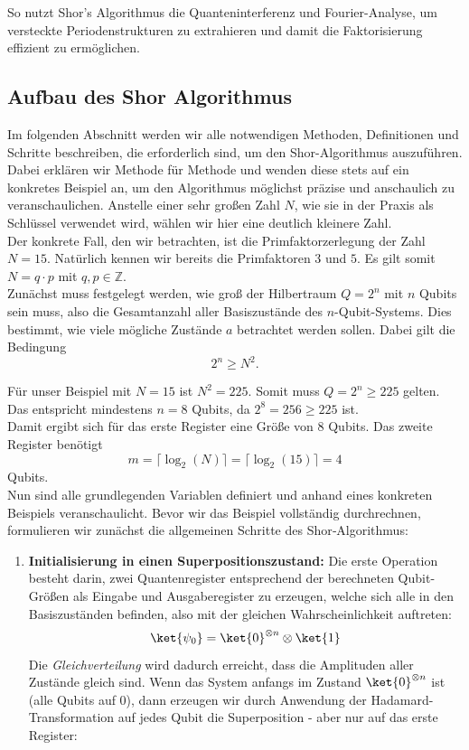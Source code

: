 {So nutzt Shor's Algorithmus die Quanteninterferenz und Fourier-Analyse, um versteckte Periodenstrukturen zu extrahieren und damit die Faktorisierung effizient zu ermöglichen.

\subsection{Aufbau des Shor Algorithmus}

Im folgenden Abschnitt werden wir alle notwendigen Methoden, Definitionen und Schritte beschreiben, die erforderlich sind, um den Shor-Algorithmus auszuführen. Dabei erklären wir Methode für Methode und wenden diese stets auf ein konkretes Beispiel an, um den Algorithmus möglichst präzise und anschaulich zu veranschaulichen. Anstelle einer sehr großen Zahl \( N \), wie sie in der Praxis als Schlüssel verwendet wird, wählen wir hier eine deutlich kleinere Zahl. \\

Der konkrete Fall, den wir betrachten, ist die Primfaktorzerlegung der Zahl \( N = 15 \). Natürlich kennen wir bereits die Primfaktoren \( 3 \) und \( 5 \). Es gilt somit \( N = q \cdot p \) mit \( q, p \in \mathbb{Z} \). \\

Zunächst muss festgelegt werden, wie groß der Hilbertraum \( Q = 2^n \) mit \( n \) Qubits sein muss, also die Gesamtanzahl aller Basiszustände des \( n \)-Qubit-Systems. Dies bestimmt, wie viele mögliche Zustände \( a \) betrachtet werden sollen. Dabei gilt die Bedingung
\[
2^n \geq N^2.
\]

Für unser Beispiel mit \( N = 15 \) ist \( N^2 = 225 \). Somit muss \( Q = 2^n \geq 225 \) gelten. Das entspricht mindestens \( n = 8 \) Qubits, da \( 2^8 = 256 \geq 225 \) ist. \\

Damit ergibt sich für das erste Register eine Größe von \( 8 \) Qubits. Das zweite Register benötigt
\[
m = \lceil \log_2(N) \rceil = \lceil \log_2(15) \rceil = 4
\]
Qubits.\\

Nun sind alle grundlegenden Variablen definiert und anhand eines konkreten Beispiels veranschaulicht. 
Bevor wir das Beispiel vollständig durchrechnen, formulieren wir zunächst die allgemeinen Schritte des Shor‑Algorithmus:

\begin{enumerate}
    \item \textbf{Initialisierung in einen Superpositionszustand:} 
    Die erste Operation besteht darin, zwei Quantenregister entsprechend der berechneten Qubit-Größen als Eingabe und Ausgaberegister zu erzeugen, welche sich alle in den Basiszuständen befinden, also mit der gleichen Wahrscheinlichkeit auftreten:
\[
\ket{\psi_0} = \ket{0}^{\otimes n} \otimes \ket{1}
\]
    Die \textit{Gleichverteilung} wird dadurch erreicht, dass die Amplituden aller Zustände gleich sind. Wenn das System anfangs im Zustand $\ket{0}^{\otimes n}$ ist (alle Qubits auf 0), dann erzeugen wir durch Anwendung der Hadamard-Transformation auf jedes Qubit die Superposition - aber nur auf das erste Register:


\end{enumerate}}
